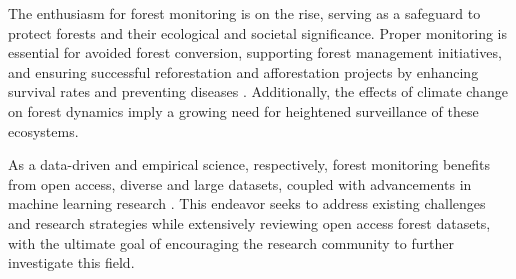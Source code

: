 \documentclass{CUP-JNL-DTM}%
\theoremstyle{definition}
\numberwithin{equation}{section}
\begin{document}
The enthusiasm for forest monitoring is on the rise, serving as a safeguard to protect forests and their ecological and societal significance.
Proper monitoring is essential for avoided forest conversion, supporting forest management initiatives, and ensuring successful reforestation and afforestation projects by enhancing survival rates and preventing diseases \cite{van_lierop_global_2015, martin_people_2021}. Additionally, the effects of climate change on forest dynamics \cite{fassnacht_remote_2023} imply a growing need for heightened surveillance of these ecosystems.
%
%

As a data-driven and empirical science, respectively, forest monitoring benefits from open access, diverse and large datasets, coupled with advancements in machine learning research \cite{de_lima_making_2022}.
This endeavor seeks to address existing challenges and research strategies while extensively reviewing open access forest datasets, with the ultimate goal of encouraging the research community to further investigate this field.
\end{document}
